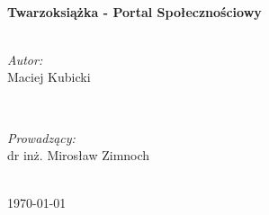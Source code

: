 \documentclass[a4paper,10pt,table]{article}
\begin{document}
\begin{titlepage}

\HRule \\[0.4cm]
{ \huge \bfseries Twarzoksiążka - Portal Społecznościowy
}\\[0.4cm] %
\HRule \\[1.5cm]
 

\begin{minipage}{0.4\textwidth}
\begin{flushleft} \large
\emph{Autor:}\\
Maciej Kubicki\\
\end{flushleft}
\end{minipage}
~
\begin{minipage}{0.4\textwidth}
\begin{flushright} \large
\emph{Prowadzący:} \\
dr inż. Mirosław Zimnoch
\end{flushright}
\end{minipage}\\[4cm]



{\large \today}\\[3cm] %


 

\vfill %


\end{titlepage}
\newpage
\tableofcontents
\newpage
\end{document}
